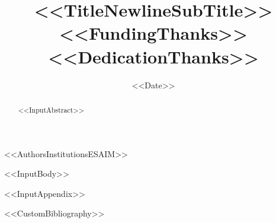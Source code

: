\documentclass[<<DocumentClassOptions>>]{cocv}
\begin{document}
\title{<<TitleNewlineSubTitle>><<FundingThanks>><<DedicationThanks>>}

<<AuthorsInstitutionsESAIM>>

\date{<<Date>>}



\begin{abstract}
<<InputAbstract>>
\end{abstract}

\maketitle

<<InputBody>>

\appendix
<<InputAppendix>>


<<CustomBibliography>>
\end{document}
